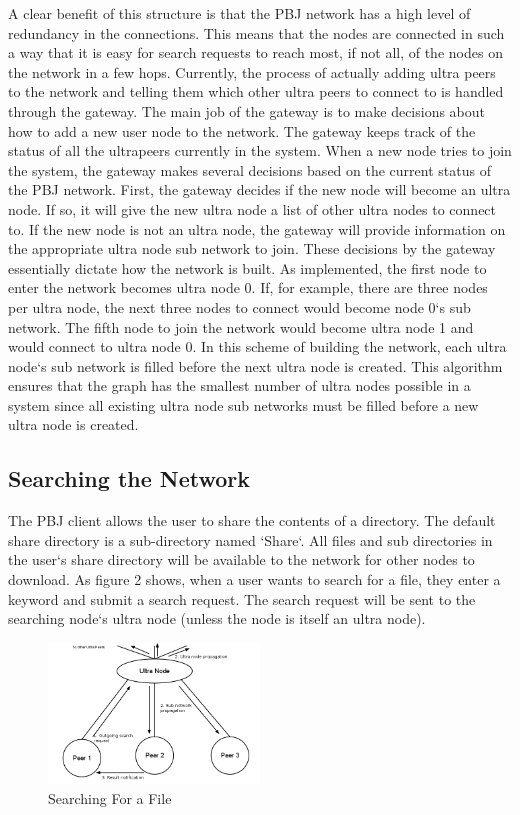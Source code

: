 \documentclass{acm_proc_article-sp}
\begin{document}
A clear benefit of this structure is that the PBJ network has a high level of redundancy in the connections.  This means that the nodes are connected in such a way that it is easy for search requests to reach most, if not all, of the nodes on the network in a few hops.  Currently, the process of actually adding ultra peers to the network and telling them which other ultra peers to connect to is handled through the gateway. The main job of the gateway is to make decisions about how to add a new user node to the network. The gateway keeps track of the status of all the ultrapeers currently in the system.  When a new node tries to join the system, the gateway makes several decisions based on the current status of the PBJ network.  First, the gateway decides if the new node will become an ultra node.  If so, it will give the new ultra node a list of other ultra nodes to connect to.  If the new node is not an ultra node, the gateway will provide information on the appropriate ultra node sub network to join. These decisions by the gateway essentially dictate how the network is built.  As implemented, the first node to enter the network becomes ultra node 0.  If, for example, there are three nodes per ultra node, the next three nodes to connect would become node 0`s sub network.  The fifth node to join the network would become ultra node 1 and would connect to ultra node 0. In this scheme of building the network, each ultra node`s sub network is filled before the next ultra node is created.  This algorithm ensures that the graph has the smallest number of ultra nodes possible in a system since all existing ultra node sub networks must be filled before a new ultra node is created.


\subsection{Searching the Network}


The PBJ client allows the user to share the contents of a directory. The default share directory is a sub-directory named `Share`. All files and sub directories in the user`s share directory will be available to the network for other nodes to download. As figure 2 shows, when a user wants to search for a file, they enter a keyword and submit a search request.  The search request will be sent to the searching node`s ultra node (unless the node is itself an ultra node).
\begin{figure}[tbh]
\centering
\includegraphics[width=0.5\textwidth]{search}
\caption{Searching For a File}
\end{figure}
\end{document}
